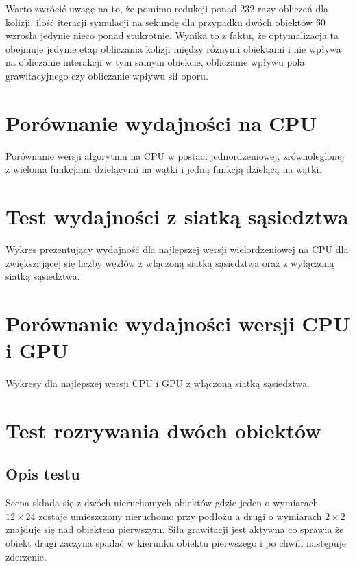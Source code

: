 \documentclass[12pt, letterpaper]{report}
\begin{document}
    Warto zwrócić uwagę na to, że pomimo redukcji ponad $232$ razy obliczeń dla kolizji, 
    ilość iteracji symulacji na sekundę dla przypadku dwóch obiektów $60 \time 60$ wzrosła jedynie
    nieco ponad stukrotnie. Wynika to z faktu, że optymalizacja ta obejmuje jedynie etap obliczania
    kolizji między różnymi obiektami i nie wpływa na obliczanie interakcji w tym samym obiekcie,
    obliczanie wpływu pola grawitacyjnego czy obliczanie wpływu sił oporu.

    \section{Porównanie wydajności na CPU}
    Porównanie wersji algorytmu na CPU w postaci jednordzeniowej, zrównoleglonej z wieloma funkcjami 
    dzielącymi na wątki i jedną funkcją dzielącą na wątki.
    
    \section{Test wydajności z siatką sąsiedztwa}
    Wykres prezentujący wydajność dla najlepszej wersji wielordzeniowej na CPU dla zwiększającej się liczby węzłów
    z włączoną siatką sąsiedztwa oraz z wyłączoną siatką sąsiedztwa.
    
    \section{Porównanie wydajności wersji CPU i GPU}
    Wykresy dla najlepszej wersji CPU i GPU z włączoną siatką sąsiedztwa.

    \section{Test rozrywania dwóch obiektów}
    \subsection{Opis testu}
    Scena składa się z dwóch nieruchomych obiektów gdzie jeden o wymiarach $12 \times 24$ zostaje umieszczony nieruchomo 
    przy podłożu a drugi o wymiarach $2 \times 2$ znajduje się nad obiektem pierwszym. Siła grawitacji jest aktywna co 
    sprawia że obiekt drugi zaczyna spadać w kierunku obiektu pierwszego i po chwili następuje zderzenie. \\ 
\end{document}
